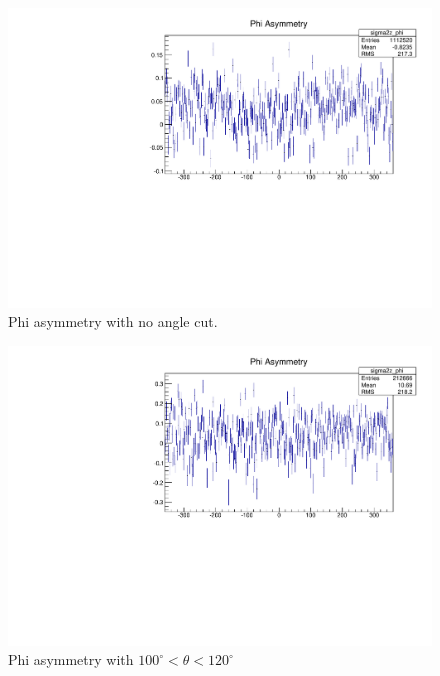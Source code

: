 \documentclass[a4paper,12pt]{article}
\begin{document}
\begin{figure}
\includegraphics[width=\textwidth]{Asym/phi_asym.pdf}
\caption{Phi asymmetry with no angle cut. }
\end{figure}

\begin{figure}
\includegraphics[width=\textwidth]{Asym/phi_asym_thetacut.pdf}
\caption{Phi asymmetry with $100^{\circ} < \theta < 120^{\circ} $ }
\end{figure}
\end{document}
